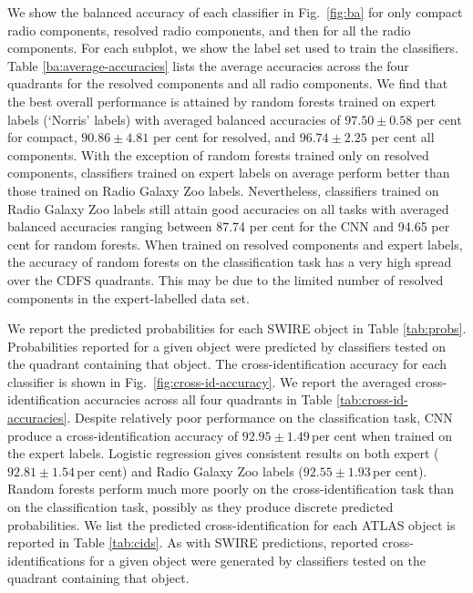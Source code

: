\documentclass[fleqn,usenatbib,usedcolumn]{mnras}
\begin{document}
  We show the balanced accuracy of each classifier in Fig.~\ref{fig:ba} for only compact radio components, resolved radio components, and then for all the radio components. For each subplot, we show the label set used to train the classifiers. Table \ref{ba:average-accuracies} lists the average accuracies across the four quadrants for the resolved components and all radio components. We find that the
  best overall performance is attained by random forests trained on expert
  labels (`Norris' labels) with averaged balanced accuracies of $97.50 \pm 0.58$ per cent for compact, $90.86 \pm 4.81$ per cent for resolved, and $96.74 \pm 2.25$ per cent all components. With the exception of random forests trained only on resolved
  components, classifiers trained on expert labels on average perform better
  than those trained on Radio Galaxy Zoo labels. Nevertheless, classifiers
  trained on Radio Galaxy Zoo labels still attain good accuracies on
  all tasks with averaged balanced accuracies ranging between 87.74 per cent for the CNN and 94.65 per cent for random forests.  When trained on resolved components and expert labels,
  the accuracy of random forests on the classification task has a very high
  spread over the CDFS quadrants. This may be due to the limited number of
  resolved components in the expert-labelled data set.

  We report the predicted probabilities for each SWIRE object in Table \ref{tab:probs}. Probabilities reported for a given object
  were predicted by classifiers tested on the quadrant containing that object. The cross-identification accuracy for each classifier is shown in
  Fig.~\ref{fig:cross-id-accuracy}. We report the averaged cross-identification accuracies across all four quadrants in Table \ref{tab:cross-id-accuracies}. Despite relatively poor performance on the
  classification task, CNN produce a cross-identification accuracy of $92.95 \pm 1.49$\,per cent when trained on the expert labels. Logistic regression gives consistent results on both expert ($92.81 \pm 1.54$\,per cent) and Radio Galaxy Zoo labels ($92.55 \pm 1.93$\,per cent). Random forests perform
  much more poorly on the cross-identification task than on the classification
  task, possibly as they produce discrete predicted probabilities. We list the predicted cross-identification for each ATLAS object is reported in
  Table \ref{tab:cids}. As with SWIRE predictions, reported cross-identifications
  for a given object were generated by classifiers tested on the quadrant
  containing that object. 
  
\end{document}
